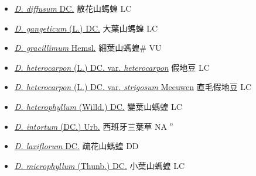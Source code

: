 \begin{itemize}
  \begin{itemize}
        \item[] \href{http://www.theplantlist.org/tpl1.1/search?q=Desmodium+diffusum}{\textit{D. diffusum} DC.}   散花山螞蝗 LC
        \item[] \href{http://www.theplantlist.org/tpl1.1/search?q=Desmodium+gangeticum}{\textit{D. gangeticum} (L.) DC.}   大葉山螞蝗 LC
        \item[] \href{http://www.theplantlist.org/tpl1.1/search?q=Desmodium+gracillimum}{\textit{D. gracillimum} Hemsl.}   細葉山螞蝗\# VU
        \item[] \href{http://www.theplantlist.org/tpl1.1/search?q=Desmodium+heterocarpon+var.+heterocarpon}{\textit{D. heterocarpon} (L.) DC. var. \textit{heterocarpon}}   假地豆 LC
        \item[] \href{http://www.theplantlist.org/tpl1.1/search?q=Desmodium+heterocarpon+var.+strigosum}{\textit{D. heterocarpon} (L.) DC. var. \textit{strigosum} Meeuwen}   直毛假地豆 LC
        \item[] \href{http://www.theplantlist.org/tpl1.1/search?q=Desmodium+heterophyllum}{\textit{D. heterophyllum} (Willd.) DC.}   變葉山螞蝗 LC
        \item[] \href{http://www.theplantlist.org/tpl1.1/search?q=Desmodium+intortum}{\textit{D. intortum} (DC.) Urb.}   西班牙三葉草 NA $^n$
        \item[] \href{http://www.theplantlist.org/tpl1.1/search?q=Desmodium+laxiflorum}{\textit{D. laxiflorum} DC.}   疏花山螞蝗 DD
        \item[] \href{http://www.theplantlist.org/tpl1.1/search?q=Desmodium+microphyllum}{\textit{D. microphyllum} (Thunb.) DC.}   小葉山螞蝗 LC

\end{itemize}
\end{itemize}
